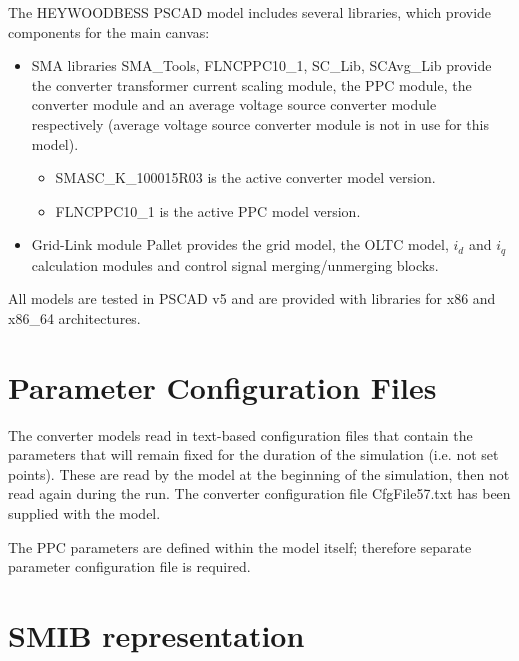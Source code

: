 \documentclass{../grid-link-report}
\begin{document}
	
	The HEYWOODBESS PSCAD model includes several libraries, which provide components for the main canvas:
	\begin{itemize}	
		\item SMA libraries SMA_Tools, FLNCPPC10_1, SC_Lib, SCAvg_Lib provide the converter transformer current scaling module, the PPC module, the converter module and an average voltage source converter module respectively (average voltage source converter module is not in use for this model).
		\begin{itemize}	
			\item SMASC_K_100015R03 is the active converter model version.
			\item FLNCPPC10_1 is the active PPC model version.
		\end{itemize} 
		\item Grid-Link module Pallet provides the grid model, the OLTC model, $i_d$ and $i_q$ calculation modules and control signal merging/unmerging blocks.
	\end{itemize} 
	All models are tested in PSCAD v5 and are provided with libraries for x86 and x86_64 architectures.
	
	
	\section{Parameter Configuration Files}
	
	The converter models read in text-based configuration files that contain the parameters that will remain fixed for the duration of the simulation (i.e. not set points). These are read by the model at the beginning of the simulation, then not read again during the run. The converter configuration file CfgFile57.txt has been supplied with the model.
	
	The PPC parameters are defined within the model itself; therefore separate parameter configuration file is required.
	

	
	
	\section{SMIB representation}
\end{document}
